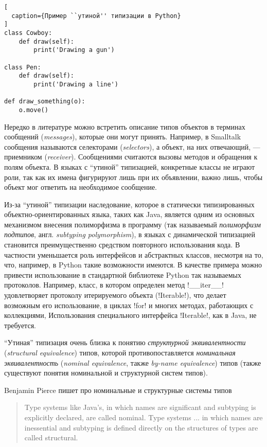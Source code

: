 \begin{lstlisting}[
  caption={Пример ``утиной'' типизации в Python}
]
class Cowboy:
    def draw(self):
        print('Drawing a gun')

class Pen:
    def draw(self):
        print('Drawing a line')

def draw_something(o):
    o.move()
\end{lstlisting}

Нередко в литературе можно встретить описание типов объектов в терминах
сообщений (\emph{messages}), которые они могут принять. Например, в Smalltalk
сообщения называются селекторами (\emph{selectors}), а объект, на них отвечающий, ---
приемником (\emph{receiver}). Сообщениями считаются вызовы методов и обращения к полям
объекта. В языках с ``утиной'' типизацией, конкретные классы не играют роли, так
как их имена фигурируют лишь при их объявлении, важно лишь, чтобы объект мог
ответить на необходимое сообщение.  

Из-за ``утиной'' типизации наследование, которое в статически
типизированных объектно-ориентированных языка, таких как Java, является
одним из основных механизмом внесения полиморфизма в программу (так называемый
\emph{полиморфизм подтипов}, англ. \emph{subtyping polymorphism}),
в языках с динамической типизацией становится преимущественно средством
повторного использования кода. В частности уменьшается роль интерфейсов и
абстрактных классов, несмотря на то, что, например, в Python такие возможности
имеются. В качестве примера можно привести использование в
стандартной библиотеке Python так называемых протоколов. Например, класс, в
котором определен метод !__iter__! удовлетворяет протоколу
итерируемого объекта (!Iterable!), что делает возможным его использование,
в циклах !for! и многих методах, работающих с коллекциями, 
Использования специального интерфейса !Iterable!, как в Java, не требуется.

``Утиная'' типизация очень близка к понятию \emph{структурной эквивалентности}
(\emph{structural equivalence}) типов, которой противопоставляется
\emph{номинальная эквивалентность} (\emph{nominal equivalence}, также
\emph{by-name equivalence}) типов (также существуют понятия номинальной и
структурной систем типов).

Benjamin Pierce пишет про номинальные и структурные системы
типов~\cite{Pierce2002}

\begin{quote}
Type systems like Java’s, in which names are significant and subtyping is
explicitly declared, are called nominal. Type systems ... in which names are
inessential and subtyping is defined directly on the structures of types are
called structural.
\end{quote}

